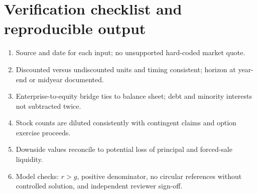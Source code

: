 \documentclass[11pt,letterpaper]{article}
\begin{document}
\section{Verification checklist and reproducible output}
\begin{enumerate}
\item Source and date for each input; no unsupported hard-coded market quote.
\item Discounted versus undiscounted units and timing consistent; horizon at year-end or midyear documented.
\item Enterprise-to-equity bridge ties to balance sheet; debt and minority interests not subtracted twice.
\item Stock counts are diluted consistently with contingent claims and option exercise proceeds.
\item Downside values reconcile to potential loss of principal and forced-sale liquidity.
\item Model checks: $r>g$, positive denominator, no circular references without controlled solution, and independent reviewer sign-off.
\end{enumerate}
\end{document}
